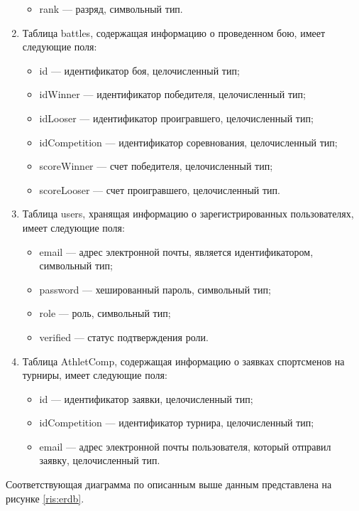 \begin{enumerate}
\begin{itemize}
		\item rank --- разряд, символьный тип.
	\end{itemize}
	\item Таблица battles, содержащая информацию о проведенном бою, имеет следующие поля: 
	\begin{itemize}
		\item id --- идентификатор боя, целочисленный тип;
		\item idWinner --- идентификатор победителя, целочисленный тип;
		\item idLooser --- идентификатор проигравшего, целочисленный тип;
		\item idCompetition --- идентификатор соревнования, целочисленный тип;
		\item scoreWinner --- счет победителя, целочисленный тип;
		\item scoreLooser --- счет проигравшего, целочисленный тип.
	\end{itemize}
	\item Таблица users, хранящая информацию о зарегистрированных пользователях, имеет следующие поля:
	\begin{itemize}
		\item email --- адрес электронной почты, является идентификатором, символьный тип;
		\item password --- хешированный пароль, символьный тип;
		\item role --- роль, символьный тип;
		\item verified --- статус подтверждения роли.
	\end{itemize}
	\item Таблица AthletComp, содержащая информацию о заявках спортсменов на турниры, имеет следующие поля:
	\begin{itemize}
		\item id --- идентификатор заявки, целочисленный тип;
		\item idCompetition --- идентификатор турнира, целочисленный тип;
		\item email --- адрес электронной почты пользователя, который отправил заявку, целочисленный тип.
	\end{itemize}
\end{enumerate}

Соответствующая диаграмма по описанным выше данным представлена на рисунке \ref{ris:erdb}.

